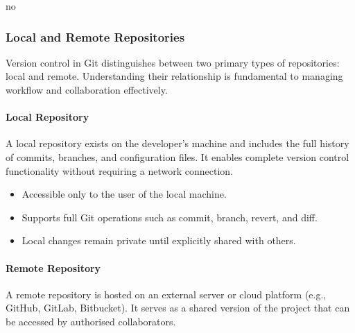 no\documentclass{article}
\begin{document}
\vspace{1em}

\begin{center}
\end{center}

\subsubsection{Local and Remote Repositories}

Version control in Git distinguishes between two primary types of repositories: local and remote. Understanding their relationship is fundamental to managing workflow and collaboration effectively.

\paragraph*{Local Repository}
A local repository exists on the developer's machine and includes the full history of commits, branches, and configuration files. It enables complete version control functionality without requiring a network connection.

\begin{itemize}
    \item Accessible only to the user of the local machine.
    \item Supports full Git operations such as commit, branch, revert, and diff.
    \item Local changes remain private until explicitly shared with others.
\end{itemize}

\paragraph*{Remote Repository}
A remote repository is hosted on an external server or cloud platform (e.g., GitHub, GitLab, Bitbucket). It serves as a shared version of the project that can be accessed by authorised collaborators.
\end{document}
